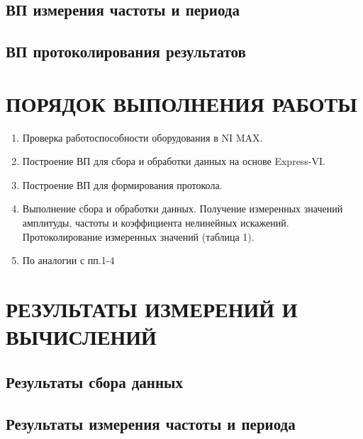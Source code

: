 \documentclass[a4paper,14pt]{article}
\begin{document}

\subsection{ВП измерения частоты и периода}


\subsection{ВП протоколирования результатов}


\section{ПОРЯДОК ВЫПОЛНЕНИЯ РАБОТЫ}
\begin{enumerate}
	\item Проверка работоспособности оборудования в NI MAX. 
	\item Построение ВП для сбора и обработки данных на основе Express-VI.
	\item Построение ВП для формирования протокола. 
	\item Выполнение сбора и обработки данных. Получение измеренных значений амплитуды, частоты и коэффициента нелинейных искажений. Протоколирование измеренных значений (таблица 1).
	\item По аналогии с пп.1-4
\end{enumerate}

\section{РЕЗУЛЬТАТЫ ИЗМЕРЕНИЙ И ВЫЧИСЛЕНИЙ}

\subsection{Результаты сбора данных}


\subsection{Результаты измерения частоты и периода}

\end{document}
